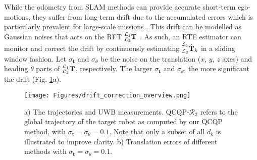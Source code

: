\documentclass[journal]{IEEEtran}
\def\Robot{\mathcal{R}}
\begin{document}
While the odometry from SLAM methods can provide accurate short-term ego-motions, they suffer from long-term drift due to the accumulated errors which is particularly prevalent for large-scale missions \cite{shenghai2021ussurvey,nguyen2022viralfusion}. This drift can be modelled as Gaussian noises that acts on the RFT $\prescript{\mathcal{L}_1}{\mathcal{L}_2}{\mathbf{T}}$ \cite{ziegler2021distributed}.
As such, an RTE estimator can monitor and correct the drift by continuously estimating $\prescript{\mathcal{L}_1}{\mathcal{L}_2}{\hat{\mathbf{T}}}_k$ in a sliding window fashion. Let $\sigma_{\mathbf{t}}$ and $\sigma_{\theta}$ be the noise on the translation ($x$, $y$, $z$ axes) and heading $\theta$ parts of $\prescript{\mathcal{L}_1}{\mathcal{L}_2}{\mathbf{T}}$, respectively. The larger $\sigma_{\mathbf{t}}$ and $\sigma_{\theta}$, the more significant the drift (Fig. \ref{fig:drift_correction_overview}a).

\begin{figure}[t]
\centering
	\texttt{[image: Figures/drift\_correction\_overview.png]}
    \caption{a) The trajectories and UWB measurements. QCQP-$\Robot_2$ refers to the global trajectory of the target robot as computed by our QCQP method, with $\sigma_{\mathbf{t}} = \sigma_{\theta} = 0.1$. Note that only a subset of all $d_k$ is illustrated to improve clarity. b) Translation errors of different methods with $\sigma_{\mathbf{t}} = \sigma_{\theta} = 0.1$.}
    \label{fig:drift_correction_overview}
\end{figure}
\end{document}
